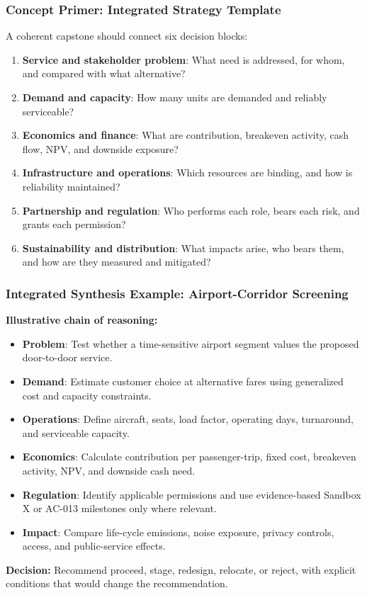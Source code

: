 \documentclass{beamer}
\begin{document}
\begin{frame}[t]
\frametitle{Concept Primer: Integrated Strategy Template}
A coherent capstone should connect six decision blocks:
\begin{enumerate}
\item \textbf{Service and stakeholder problem}: What need is addressed, for whom, and compared with what alternative?
\item \textbf{Demand and capacity}: How many units are demanded and reliably serviceable?
\item \textbf{Economics and finance}: What are contribution, breakeven activity, cash flow, NPV, and downside exposure?
\item \textbf{Infrastructure and operations}: Which resources are binding, and how is reliability maintained?
\item \textbf{Partnership and regulation}: Who performs each role, bears each risk, and grants each permission?
\item \textbf{Sustainability and distribution}: What impacts arise, who bears them, and how are they measured and mitigated?
\end{enumerate}
\end{frame}

\begin{frame}[t,shrink=10]
\frametitle{Integrated Synthesis Example: Airport-Corridor Screening}
\textbf{Illustrative chain of reasoning:}
\begin{itemize}
\item \textbf{Problem}: Test whether a time-sensitive airport segment values the proposed door-to-door service.
\item \textbf{Demand}: Estimate customer choice at alternative fares using generalized cost and capacity constraints.
\item \textbf{Operations}: Define aircraft, seats, load factor, operating days, turnaround, and serviceable capacity.
\item \textbf{Economics}: Calculate contribution per passenger-trip, fixed cost, breakeven activity, NPV, and downside cash need.
\item \textbf{Regulation}: Identify applicable permissions and use evidence-based Sandbox X or AC-013 milestones only where relevant.
\item \textbf{Impact}: Compare life-cycle emissions, noise exposure, privacy controls, access, and public-service effects.
\end{itemize}
\textbf{Decision:} Recommend proceed, stage, redesign, relocate, or reject, with explicit conditions that would change the recommendation.
\end{frame}
\end{document}
